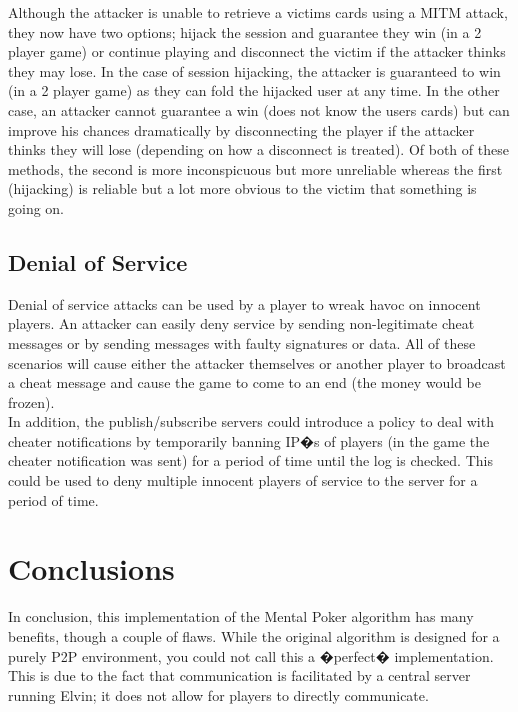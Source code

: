 \documentclass[11pt, oneside]{article}   	%
\begin{document}
Although the attacker is unable to retrieve a victims cards using a MITM attack, they now have two options; hijack the session and guarantee they win (in a 2 player game) or continue playing and disconnect the victim if the attacker thinks they may lose. In the case of session hijacking, the attacker is guaranteed to win (in a 2 player game) as they can fold the hijacked user at any time. In the other case, an attacker cannot guarantee a win (does not know the users cards) but can improve his chances dramatically by disconnecting the player if the attacker thinks they will lose (depending on how a disconnect is treated). Of both of these methods, the second is more inconspicuous but more unreliable whereas the first (hijacking) is reliable but a lot more obvious to the victim that something is going on.\\

\subsection{Denial of Service}

Denial of service attacks can be used by a player to wreak havoc on innocent players. An attacker can easily deny service by sending non-legitimate cheat messages or by sending messages with faulty signatures or data. All of these scenarios will cause either the attacker themselves or another player to broadcast a cheat message and cause the game to come to an end (the money would be frozen).\\

In addition, the publish/subscribe servers could introduce a policy to deal with cheater notifications by temporarily banning IP�s of players (in the game the cheater notification was sent) for a period of time until the log is checked. This could be used to deny multiple innocent players of service to the server for a period of time.\\

\section{Conclusions}

In conclusion, this implementation of the Mental Poker algorithm has many benefits, though a couple of flaws. While the original algorithm is designed for a purely P2P environment, you could not call this a �perfect� implementation. This is due to the fact that communication is facilitated by a central server running Elvin; it does not allow for players to directly communicate.\\
\end{document}

